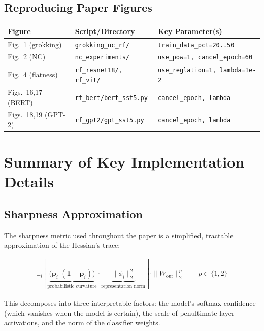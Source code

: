 \documentclass[11pt,a4paper]{article}
\theoremstyle{definition}
\begin{document}
\subsection{Reproducing Paper Figures}
\begin{center}
\begin{tabular}{lll}
\toprule
\textbf{Figure} & \textbf{Script/Directory} & \textbf{Key Parameter(s)} \\
\midrule
Fig.~1 (grokking) & \texttt{grokking\_nc\_rf/} & \texttt{train\_data\_pct=20..50} \\
Fig.~2 (NC) & \texttt{nc\_experiments/} & \texttt{use\_pow=1, cancel\_epoch=60} \\
Fig.~4 (flatness) & \texttt{rf\_resnet18/, rf\_vit/} & \texttt{use\_reglation=1, lambda=1e-2} \\
Figs.~16,17 (BERT) & \texttt{rf\_bert/bert\_sst5.py} & \texttt{cancel\_epoch, lambda} \\
Figs.~18,19 (GPT-2) & \texttt{rf\_gpt2/gpt\_sst5.py} & \texttt{cancel\_epoch, lambda} \\
\bottomrule
\end{tabular}
\end{center}

\section{Summary of Key Implementation Details}

\subsection{Sharpness Approximation}
The sharpness metric used throughout the paper is a simplified, tractable approximation
of the Hessian's trace:

\begin{align}
    \mathbb{E}_i\left[ \underbrace{\bigl(\mathbf{p}_i^\top(\mathbf{1} - \mathbf{p}_i)\bigr)}_{
        \text{probabilistic curvature}} \cdot
    \underbrace{\|\phi_i\|_2^2}_{\text{representation norm}} \right]
    \cdot \|W_{\text{out}}\|_2^p \qquad p \in \{1,2\}
\end{align}

This decomposes into three interpretable factors: the model's softmax confidence
(which vanishes when the model is certain), the scale of penultimate-layer activations,
and the norm of the classifier weights.
\end{document}

